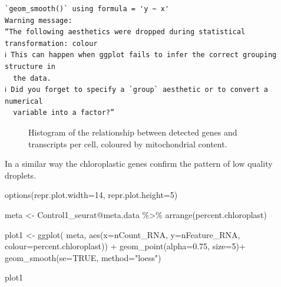 \documentclass[
  letterpaper,
  DIV=11,
  numbers=noendperiod]{scrartcl}
\newenvironment{Shaded}{}{}
\newcommand{\AttributeTok}[1]{\textcolor[rgb]{0.49,0.56,0.16}{#1}}
\newcommand{\ConstantTok}[1]{\textcolor[rgb]{0.53,0.00,0.00}{#1}}
\newcommand{\DecValTok}[1]{\textcolor[rgb]{0.25,0.63,0.44}{#1}}
\newcommand{\FloatTok}[1]{\textcolor[rgb]{0.25,0.63,0.44}{#1}}
\newcommand{\FunctionTok}[1]{\textcolor[rgb]{0.02,0.16,0.49}{#1}}
\newcommand{\NormalTok}[1]{#1}
\newcommand{\OtherTok}[1]{\textcolor[rgb]{0.00,0.44,0.13}{#1}}
\newcommand{\SpecialCharTok}[1]{\textcolor[rgb]{0.25,0.44,0.63}{#1}}
\newcommand{\StringTok}[1]{\textcolor[rgb]{0.25,0.44,0.63}{#1}}
\begin{document}
\begin{verbatim}
`geom_smooth()` using formula = 'y ~ x'
Warning message:
“The following aesthetics were dropped during statistical transformation: colour
ℹ This can happen when ggplot fails to infer the correct grouping structure in
  the data.
ℹ Did you forget to specify a `group` aesthetic or to convert a numerical
  variable into a factor?”
\end{verbatim}

\begin{figure}[H]


\caption{\label{fig-gentra}Histogram of the relationship between
detected genes and transcripts per cell, coloured by mitochondrial
content.}

\end{figure}%

In a similar way the chloroplastic genes confirm the pattern of low
quality droplets.

\begin{Shaded}
\begin{Highlighting}[]
\FunctionTok{options}\NormalTok{(}\AttributeTok{repr.plot.width=}\DecValTok{14}\NormalTok{, }\AttributeTok{repr.plot.height=}\DecValTok{5}\NormalTok{)}

\NormalTok{meta }\OtherTok{\textless{}{-}}\NormalTok{ Control1\_seurat}\SpecialCharTok{@}\NormalTok{meta.data }\SpecialCharTok{\%\textgreater{}\%} \FunctionTok{arrange}\NormalTok{(percent.chloroplast)}

\NormalTok{plot1 }\OtherTok{\textless{}{-}} \FunctionTok{ggplot}\NormalTok{( meta, }\FunctionTok{aes}\NormalTok{(}\AttributeTok{x=}\NormalTok{nCount\_RNA, }\AttributeTok{y=}\NormalTok{nFeature\_RNA, }\AttributeTok{colour=}\NormalTok{percent.chloroplast)) }\SpecialCharTok{+} 
         \FunctionTok{geom\_point}\NormalTok{(}\AttributeTok{alpha=}\FloatTok{0.75}\NormalTok{, }\AttributeTok{size=}\DecValTok{5}\NormalTok{)}\SpecialCharTok{+}
         \FunctionTok{geom\_smooth}\NormalTok{(}\AttributeTok{se=}\ConstantTok{TRUE}\NormalTok{, }\AttributeTok{method=}\StringTok{"loess"}\NormalTok{)}

\NormalTok{plot1}
\end{Highlighting}
\end{Shaded}
\end{document}
